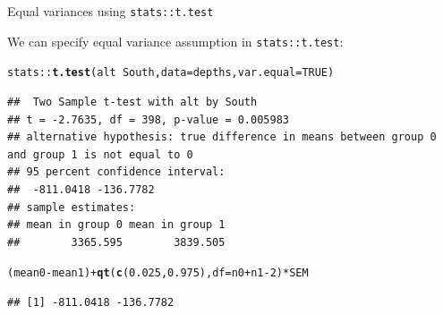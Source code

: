 \documentclass[10pt]{beamer}\usepackage[]{graphicx}\usepackage[]{color}
\makeatletter
\newcommand{\hlnum}[1]{\textcolor[rgb]{0.686,0.059,0.569}{#1}}%
\newcommand{\hlopt}[1]{\textcolor[rgb]{0,0,0}{#1}}%
\newcommand{\hlstd}[1]{\textcolor[rgb]{0.345,0.345,0.345}{#1}}%
\newcommand{\hlkwc}[1]{\textcolor[rgb]{0.333,0.667,0.333}{#1}}%
\newcommand{\hlkwd}[1]{\textcolor[rgb]{0.737,0.353,0.396}{\textbf{#1}}}%
\newenvironment{kframe}{%
 \def\at@end@of@kframe{}%
 \ifinner\ifhmode%
  \def\at@end@of@kframe{\end{minipage}}%
  \begin{minipage}{\columnwidth}%
 \fi\fi%
 \def\FrameCommand##1{\hskip\@totalleftmargin \hskip-\fboxsep
 \colorbox{shadecolor}{##1}\hskip-\fboxsep
     \hskip-\linewidth \hskip-\@totalleftmargin \hskip\columnwidth}%
 \MakeFramed {\advance\hsize-\width
   \@totalleftmargin\z@ \linewidth\hsize
   \@setminipage}}%
 {\par\unskip\endMakeFramed%
 \at@end@of@kframe}
\newenvironment{knitrout}{}{} %
\makeatother
\begin{document}
\begin{frame}[fragile]{Equal variances using \texttt{stats::t.test}}
	
	We can specify equal variance assumption in \texttt{stats::t.test}:
	
\begin{knitrout}\scriptsize
{}\color{fgcolor}\begin{kframe}
\begin{alltt}
\hlstd{stats}\hlopt{::}\hlkwd{t.test}\hlstd{(alt} \hlopt{~} \hlstd{South,} \hlkwc{data} \hlstd{= depths,} \hlkwc{var.equal} \hlstd{=} \hlnum{TRUE}\hlstd{)}
\end{alltt}
\begin{verbatim}
##  Two Sample t-test with alt by South 
## t = -2.7635, df = 398, p-value = 0.005983
## alternative hypothesis: true difference in means between group 0 and group 1 is not equal to 0 
## 95 percent confidence interval:
##  -811.0418 -136.7782 
## sample estimates:
## mean in group 0 mean in group 1 
##        3365.595        3839.505
\end{verbatim}
\begin{alltt}
\hlstd{(mean0} \hlopt{-} \hlstd{mean1)} \hlopt{+} \hlkwd{qt}\hlstd{(}\hlkwd{c}\hlstd{(}\hlnum{0.025}\hlstd{,} \hlnum{0.975}\hlstd{),} \hlkwc{df} \hlstd{= n0} \hlopt{+} \hlstd{n1} \hlopt{-} \hlnum{2}\hlstd{)} \hlopt{*} \hlstd{SEM}
\end{alltt}
\begin{verbatim}
## [1] -811.0418 -136.7782
\end{verbatim}
\end{kframe}
\end{knitrout}
	
	
\end{frame}




\end{document}
